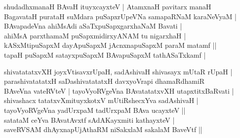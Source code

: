 \begin{entry}
\gl{}
\info{}{}{}{}
\begin{shl}
shudadhxmanaH BAvaH ituyxcayxteV | AtamxnaH pavitarx manaH\\
BagavataH purataH suMdara puSapxrUpeVNa samapaRNaM karaNeVyaM |\\
BAvapadeVna ahiMsAdi aSaTxpuSapxgarxhaNaM Bavati |\\
ahiMsA parxthamaM puSapxmidirxyANAM tu nigarxhaH |\\
kASxMtipuSapxM dayApuSapxM jAcnxnapuSapxM paraM matamf ||\\
tapaH puSapxM satayxpuSapxM BAvapuSapxM tathASaTxkamf |
\end{shl}
\begin{shl}
shivatatatxvXH joyxVtisavxrUpaH, sadAshivaH shivasayx mUtaR rUpaH |\\
parashivatatatxH saDashivatatatxH davxyoVrapi dhamaRdhamiR\\
BAveVna vateRVteV | tayoVyoRVgeVna BAvatatatxvXH utapxtitxBaRvati |\\
shivashacx tatatxvXmituyxkotxV mUtiRshecxYva sadAshivaH |\\
tayoVyoRVgeVna yadUrxpaM tadUrxpaM BAva ucayxteV ||\\
satataM ceYva BAvatAvxtf sAdAKayxmiti kathayxteV |\\
saveRVSAM dhAyxnapUjAthaRM niSakxlaM sakalaM BaveVtf ||
\end{shl}
\end{entry}

